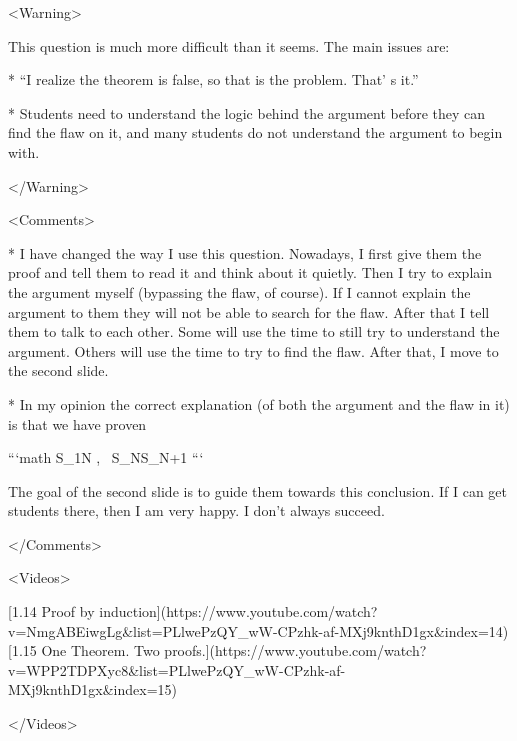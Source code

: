 <Warning>

This question is much more difficult than it seems. The main issues are:

*   “I realize the theorem is false, so that is the problem. That’ s it.”

*   Students need to understand the logic behind the argument before they can find the flaw on it, and many students do not understand the argument to begin with.

</Warning>

<Comments>

*   I have changed the way I use this question. Nowadays, I first give them the proof and tell them to read it and think about it quietly. Then I try to explain the argument myself (bypassing the flaw, of course). If I cannot explain the argument to them they will not be able to search for the flaw. After that I tell them to talk to each other. Some will use the time to still try to understand the argument. Others will use the time to try to find the flaw. After that, I move to the second slide.

*   In my opinion the correct explanation (of both the argument and the flaw in it) is that we have proven

    ```math
    S_{1}\quad {}\quad \forall N , \, S_{N}\implies S_{N+1}
    ```

    The goal of the second slide is to guide them towards this conclusion. If I can get students there, then I am very happy. I don’t always succeed.

</Comments>

<Videos>

[1.14 Proof by induction](https://www.youtube.com/watch?v=NmgABEiwgLg\&list=PLlwePzQY_wW-CPzhk-af-MXj9knthD1gx\&index=14)[1.15 One Theorem. Two proofs.](https://www.youtube.com/watch?v=WPP2TDPXyc8\&list=PLlwePzQY_wW-CPzhk-af-MXj9knthD1gx\&index=15)

</Videos>
